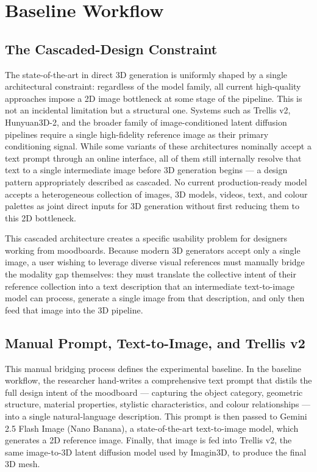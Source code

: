 \section{Baseline Workflow}
\label{sec:baseline}

\subsection{The Cascaded-Design Constraint}

The state-of-the-art in direct 3D generation is uniformly shaped by a single architectural constraint: regardless of the model family, all current high-quality approaches impose a 2D image bottleneck at some stage of the pipeline. This is not an incidental limitation but a structural one. Systems such as Trellis v2, Hunyuan3D-2, and the broader family of image-conditioned latent diffusion pipelines require a single high-fidelity reference image as their primary conditioning signal. While some variants of these architectures nominally accept a text prompt through an online interface, all of them still internally resolve that text to a single intermediate image before 3D generation begins — a design pattern appropriately described as cascaded. No current production-ready model accepts a heterogeneous collection of images, 3D models, videos, text, and colour palettes as joint direct inputs for 3D generation without first reducing them to this 2D bottleneck.

This cascaded architecture creates a specific usability problem for designers working from moodboards. Because modern 3D generators accept only a single image, a user wishing to leverage diverse visual references must manually bridge the modality gap themselves: they must translate the collective intent of their reference collection into a text description that an intermediate text-to-image model can process, generate a single image from that description, and only then feed that image into the 3D pipeline.

\subsection{Manual Prompt, Text-to-Image, and Trellis v2}

This manual bridging process defines the experimental baseline. In the baseline workflow, the researcher hand-writes a comprehensive text prompt that distils the full design intent of the moodboard --- capturing the object category, geometric structure, material properties, stylistic characteristics, and colour relationships --- into a single natural-language description. This prompt is then passed to Gemini 2.5 Flash Image (Nano Banana), a state-of-the-art text-to-image model, which generates a 2D reference image. Finally, that image is fed into Trellis v2, the same image-to-3D latent diffusion model used by Imagin3D, to produce the final 3D mesh.

